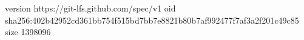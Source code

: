 version https://git-lfs.github.com/spec/v1
oid sha256:402b42952cd361bb754f515bd7bb7e8821b80b7af992477f7af3a2f201c49c85
size 1398096

